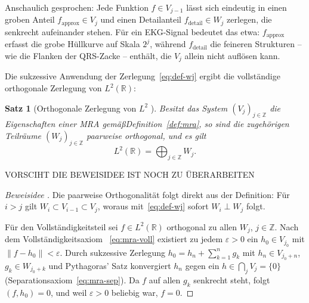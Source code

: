\documentclass[a4paper,11pt,bibliography=totoc,listof=totoc,headinclude=true,cleardoublepage=empty,oneside]{scrbook}
\newtheorem{satz}[theorem]{Satz}
\theoremstyle{definition}
\theoremstyle{remark}
\begin{document}
   Anschaulich gesprochen: Jede Funktion $f \in V_{j-1}$ lässt sich
   eindeutig in einen groben Anteil $f_{\text{approx}} \in V_j$
   und einen Detailanteil $f_{\text{detail}} \in W_j$ zerlegen,
   die senkrecht aufeinander stehen.
   Für ein EKG-Signal bedeutet das etwa: $f_{\text{approx}}$ erfasst
   die grobe Hüllkurve auf Skala $2^j$, während $f_{\text{detail}}$
   die feineren Strukturen -- wie die Flanken der QRS-Zacke -- enthält,
   die $V_j$ allein nicht auflösen kann.
   
   \medskip
   
   Die sukzessive Anwendung der Zerlegung~\eqref{eq:def-wj} ergibt die
   vollständige orthogonale Zerlegung von $L^2(\mathbb{R})$:
   
   \begin{satz}[Orthogonale Zerlegung von $L^2$
     {\cite[S.\,108, Satz~5.1]{blatterWaveletsEinfuhrung2003}}]
   \label{satz:l2-zerlegung}
   Besitzt das System $(V_j)_{j\in\mathbb{Z}}$ die Eigenschaften einer MRA
   gemä\ss Definition~\ref{def:mra}, so sind die zugehörigen Teilräume
   $(W_j)_{j\in\mathbb{Z}}$ paarweise orthogonal, und es gilt 
   \begin{equation}
     \label{eq:l2-zerlegung}
     L^2(\mathbb{R}) = \bigoplus_{j \in \mathbb{Z}} W_j.
   \end{equation}
   \end{satz}
   

   VORSCIHT DIE BEWEISIDEE IST NOCH ZU ÜBERARBEITEN
   \begin{proof}[Beweisidee {\cite[S.\,108]{blatterWaveletsEinfuhrung2003}}]
   Die paarweise Orthogonalität folgt direkt aus der Definition: Für $i > j$
   gilt $W_i \subset V_{i-1} \subset V_j$, woraus mit~\eqref{eq:def-wj}
   sofort $W_i \perp W_j$ folgt.
   
   Für den Vollständigkeitsteil sei $f \in L^2(\mathbb{R})$ orthogonal
   zu allen $W_j$, $j \in \mathbb{Z}$. Nach dem Vollständigkeitsaxiom~%
   \eqref{eq:mra-voll} existiert zu jedem $\varepsilon > 0$ ein $h_0 \in V_{j_0}$
   mit $\|f - h_0\| < \varepsilon$. Durch sukzessive Zerlegung
   $h_0 = h_n + \sum_{k=1}^n g_k$ mit $h_n \in V_{j_0+n}$,
   $g_k \in W_{j_0+k}$ und Pythagoras' Satz konvergiert $h_n$ gegen
   ein $h \in \bigcap_j V_j = \{0\}$ (Separationsaxiom~\eqref{eq:mra-sep}).
   Da $f$ auf allen $g_k$ senkrecht steht, folgt $(f, h_0) = 0$,
   und weil $\varepsilon > 0$ beliebig war, $f = 0$.
   \end{proof}
   
\end{document}
